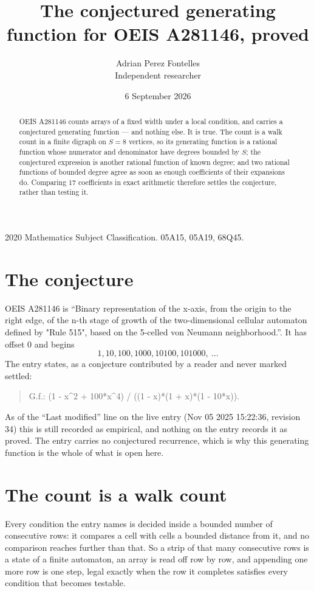 \documentclass[11pt,a4paper]{article}
\title{The conjectured generating function for OEIS A281146, proved}
\author{Adrian Perez Fontelles\\ \small Independent researcher}
\date{6 September 2026}
\theoremstyle{plain}
\theoremstyle{definition}
\begin{document}
\maketitle

\begin{abstract}
OEIS A281146 counts arrays of a fixed width under a local condition, and carries a conjectured
generating function --- and nothing else. It is true. The count is a walk count in a finite
digraph on $S=8$ vertices, so its generating function is a rational function whose numerator
and denominator have degrees bounded by $S$; the conjectured expression is another rational
function of known degree; and two rational functions of bounded degree agree as soon as enough
coefficients of their expansions do. Comparing $17$ coefficients in exact arithmetic
therefore settles the conjecture, rather than testing it.
\end{abstract}

\noindent\small 2020 Mathematics Subject Classification. 05A15, 05A19, 68Q45.\normalsize

\section{The conjecture}

OEIS A281146 is ``Binary representation of the x-axis, from the origin to the right edge, of the n-th stage of growth of the two-dimensional cellular automaton defined by "Rule 515", based on the 5-celled von Neumann neighborhood.''. It has offset $0$ and begins
\[
1, 10, 100, 1000, 10100, 101000,\ \dots
\]
The entry states, as a conjecture contributed by a reader and never marked settled:
\begin{quote}
G.f.: (1 - x\^{}2 + 100*x\^{}4) / ((1 - x)*(1 + x)*(1 - 10*x)).
\end{quote}
As of the ``Last modified'' line on the live entry (Nov 05 2025 15:22:36, revision 34) this is still
recorded as empirical, and nothing on the entry records it as proved. The entry carries no
conjectured recurrence, which is why this generating function is the whole of what is open
here.

\section{The count is a walk count}

Every condition the entry names is decided inside a bounded number of consecutive rows: it
compares a cell with cells a bounded distance from it, and no comparison reaches further than
that. So a strip of that many consecutive rows is a state of a finite automaton, an array is
read off row by row, and appending one more row is one step, legal exactly when the row it
completes satisfies every condition that becomes testable.
\end{document}
